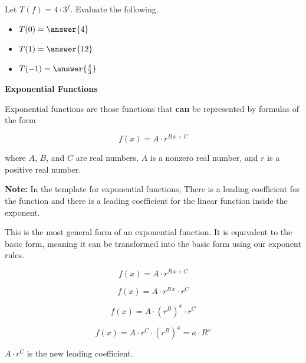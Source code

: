 \documentclass{ximera}
\begin{document}
\begin{example}

Let $T(f) = 4 \cdot 3^f$.  Evaluate the following.

\begin{itemize}
\item $T(0) = \answer{4}$ 
\item $T(1) = \answer{12}$
\item $T(-1) = \answer{\frac{4}{3}}$
\end{itemize}
\end{example}
















\begin{definition} \textbf{\textcolor{green!50!black}{Exponential Functions}}

Exponential functions are those functions that \textbf{\textcolor{purple!85!blue}{can}} be represented by formulas of the form


\[      f(x) = A \cdot r^{B \, x + C}   \]

where $A$, $B$, and $C$ are real numbers, $A$ is a nonzero real number, and $r$ is a positive real number.


\end{definition}

\textbf{Note:}  In the template for exponential functions, There is a leading coefficient for the function and there is a leading coefficient for the linear function inside the exponent. 



This is the most general form of an exponential function.  It is equivalent to the basic form, meaning it can be transformed into the basic form using our exponent rules.




\[
f(x) = A \cdot r^{B \, x + C} 
\]

\[
f(x) = A \cdot r^{B \, x} \cdot  r^C 
\]

\[
f(x) = A \cdot (r^{B})^x \cdot  r^C 
\]


\[
f(x) = A \cdot r^C \cdot (r^{B})^x = a \cdot R^x
\]





$A \cdot r^C$ is the new leading coefficient. 
\end{document}
